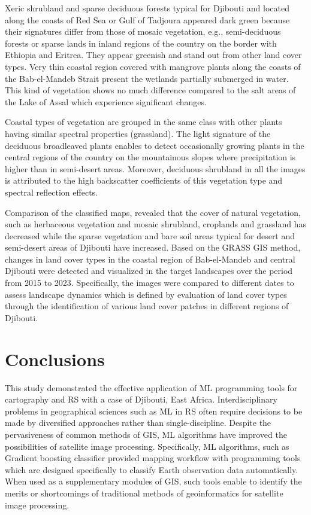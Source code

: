 \documentclass[jimaging,article,submit,pdftex,moreauthors]{Definitions/mdpi}
\begin{document}
Xeric shrubland and sparse deciduous forests typical for Djibouti and located along the coasts of Red Sea or Gulf of Tadjoura appeared dark green because their signatures differ from those of mosaic vegetation, e.g., semi-deciduous forests or sparse lands in inland regions of the country on the border with Ethiopia and Eritrea. They appear greenish and stand out from other land cover types. Very thin coastal region covered with mangrove plants along the coasts of the Bab-el-Mandeb Strait present the wetlands partially submerged in water. This kind of vegetation shows no much difference compared to the salt areas of the Lake of Assal which experience significant changes. 

Coastal types of vegetation are grouped in the same class with other plants having similar spectral properties (grassland). The light signature of the deciduous broadleaved plants enables to detect occasionally growing plants in the central regions of the country on the mountainous slopes where precipitation is higher than in semi-desert areas. Moreover, deciduous shrubland in all the images is attributed to the high backscatter coefficients of this vegetation type and spectral reflection effects.

Comparison of the classified maps, revealed that the cover of natural vegetation, such as herbaceous vegetation and mosaic shrubland, croplands and grassland has decreased while the sparse vegetation and bare soil areas typical for desert and semi-desert areas of Djibouti have increased. Based on the GRASS GIS method, changes in land cover types in the coastal region of Bab-el-Mandeb and central Djibouti were detected and visualized in the target landscapes over the period from 2015 to 2023. Specifically, the images were compared to different dates to assess landscape dynamics which is defined by evaluation of land cover types through the identification of various land cover patches in different regions of Djibouti.

\section{Conclusions}

This study demonstrated the effective application of ML programming tools for cartography and RS with a case of Djibouti, East Africa. Interdisciplinary problems in geographical sciences such as ML in RS often require decisions to be made by diversified approaches rather than single-discipline. Despite the pervasiveness of common methods of GIS, ML algorithms have improved the possibilities of satellite image processing. Specifically, ML algorithms, such as Gradient boosting classifier provided mapping workflow with programming tools which are designed specifically to classify Earth observation data automatically. When used as a supplementary modules of GIS, such tools enable to identify the merits or shortcomings of traditional methods of geoinformatics for satellite image processing.
\end{document}

